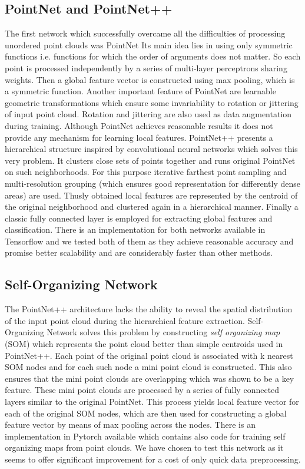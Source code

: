 \subsection{PointNet and PointNet++}
The first network which successfully overcame all the difficulties of processing unordered point clouds was PointNet \cite{qi_pointnet:_2016} Its main idea lies in using only symmetric functions i.e. functions for which the order of arguments does not matter. So each point is processed independently by a series of multi-layer perceptrons sharing weights. Then a global feature vector is constructed using max pooling, which is a symmetric function. Another important feature of PointNet are learnable geometric transformations which ensure some invariability to rotation or jittering of input point cloud. Rotation and jittering are also used as data augmentation during training. Although PointNet achieves reasonable results it does not provide any mechanism for learning local features. 
PointNet++ \cite{qi_pointnet++:_2017} presents a hierarchical structure inspired by convolutional neural networks which solves this very problem. It clusters close sets of points together and runs original PointNet on such neighborhoods. For this purpose iterative farthest point sampling and multi-resolution grouping (which ensures good representation for differently dense areas) are used. Thusly obtained local features are represented by the centroid of the original neighborhood and clustered again in a hierarchical manner. Finally a classic fully connected layer is employed for extracting global features and classification.
There is an implementation for both networks available in Tensorflow and we tested both of them as they achieve reasonable accuracy and promise better scalability and are considerably faster than other methods.

\subsection{Self-Organizing Network}
The PointNet++ architecture lacks the ability to reveal the spatial distribution of the input point cloud during the hierarchical feature extraction. Self-Organizing Network \cite{li_so-net:_2018} solves this problem by constructing \textit{self organizing map} (SOM) which represents the point cloud better than simple centroids used in PointNet++. Each point of the original point cloud is associated with k nearest SOM nodes and for each such node a mini point cloud is constructed. This also ensures that the mini point clouds are overlapping which was shown to be a key feature. These mini point clouds are processed by a series of fully connected layers similar to the original PointNet. This process yields local feature vector for each of the original SOM nodes, which are then used for constructing a global feature vector by means of max pooling across the nodes. There is an implementation in Pytorch available which contains also code for training self organizing maps from point clouds. We have chosen to test this network as it seems to offer significant improvement for a cost of only quick data preprocessing.

